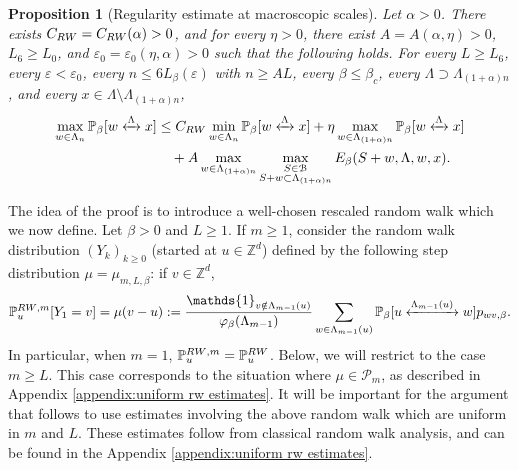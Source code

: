 \documentclass[11pt,a4paper]{article}
\numberwithin{equation}{section}
\theoremstyle{plain}
\newtheorem{Prop}[Thm]{Proposition}
\theoremstyle{definition}
\newcommand{\connect}{\xleftrightarrow}
\begin{document}
\begin{Prop}[Regularity estimate at macroscopic scales]\label{prop:regularity perco 2} Let $\alpha>0$. There exists $C_{\rm RW}=C_{\rm RW}(\alpha)>0$, and for every $\eta>0$, there exist $A=A(\alpha,\eta)>0$, $L_6\geq L_0$, and $\varepsilon_0=\varepsilon_0(\eta,\alpha)>0$ such that the following holds. For every $L\geq L_6$, every $\varepsilon<\varepsilon_0$, every $n\le 6L_\beta(\varepsilon)$  with $n\geq AL$, every $\beta\le \beta_c$, every $\Lambda\supset\Lambda_{(1+\alpha)n}$, and every $x\in \Lambda\setminus \Lambda_{(1+\alpha)n}$,
\begin{align}
\max_{w\in \Lambda_n}\mathbb P_\beta[w\connect{\Lambda\:}x]&\le C_{\rm RW}\min_{w\in \Lambda_n}\mathbb P_\beta[w\connect{\Lambda\:}x]+\eta \max_{w\in \Lambda_{(1+\alpha)n}}\mathbb P_\beta[w\connect{\Lambda\:}x]\notag
\\&\quad+A\max_{w\in \Lambda_{(1+\alpha)n}}\max_{\substack{S\in \mathcal B\\S+w\subset \Lambda_{(1+\alpha)n}}}{E}_\beta(S+w, \Lambda,w,x).
\end{align}
\end{Prop}
The idea of the proof is to introduce a well-chosen rescaled random walk which we now define. Let $\beta>0$ and $L\geq 1$. If $m\geq 1$, consider the random walk distribution $(Y_k)_{k\geq 0}$ (started at $u\in \mathbb Z^d$) defined by the following step distribution $\mu=\mu_{m,L,\beta}$: if $v\in \mathbb Z^d$,
\begin{equation}\label{eq: rescaled rw def}
	\mathbb P^{{\rm RW},m}_{u}[Y_1=v]=\mu(v-u):=\frac{\mathds{1}_{v\notin \Lambda_{m-1}(u)}}{\varphi_\beta(\Lambda_{m-1})}\sum_{w\in \Lambda_{m-1}(u)}\mathbb P_\beta[u\connect{\Lambda_{m-1}(u)\:}w]p_{wv,\beta}.
\end{equation}
In particular, when $m=1$, $\mathbb P^{{\rm RW},m}_u=\mathbb P^{\rm RW}_u$. Below, we will restrict to the case $m\geq L$. This case corresponds to the situation where $\mu\in \mathcal P_m$, as described in Appendix \ref{appendix:uniform rw estimates}. It will be important for the argument that follows to use estimates involving the above random walk which are uniform in $m$ and $L$. These estimates follow from classical random walk analysis, and can be found in the Appendix \ref{appendix:uniform rw estimates}.
\end{document}
